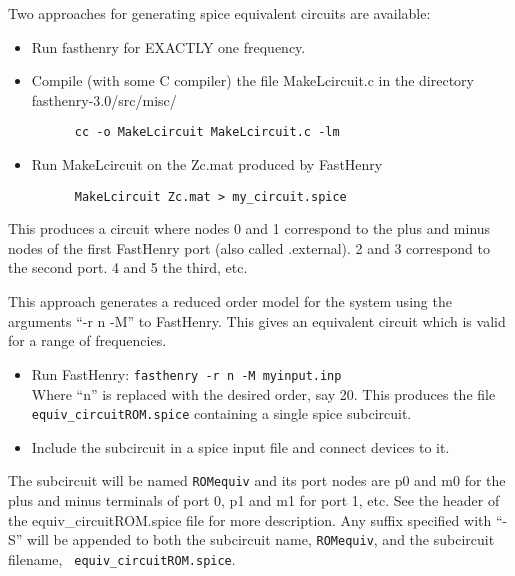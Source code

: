 Two approaches for generating spice equivalent circuits are available:

\vspace{0.1in}
  \begin{itemize}
    \item Run fasthenry for EXACTLY one frequency.
    \item Compile (with some C compiler) the file MakeLcircuit.c in
      the directory fasthenry-3.0/src/misc/ 
    \begin{verbatim}
      cc -o MakeLcircuit MakeLcircuit.c -lm
    \end{verbatim}
    \vspace{-0.1in}
    \item Run MakeLcircuit on the Zc.mat produced by FastHenry
    \begin{verbatim}
      MakeLcircuit Zc.mat > my_circuit.spice
    \end{verbatim}
  \end{itemize}

This produces a circuit where nodes 0 and 1 correspond to the plus and
minus nodes of the first
FastHenry port (also called .external).  2 and 3 correspond to the second port.
4 and 5 the third, etc.

\vspace{0.1in}

This approach generates a reduced order model for the system using the 
   arguments ``-r n -M'' to FastHenry.  This gives an equivalent
   circuit which is valid for a range of
   frequencies.
\begin{itemize}
   \item Run FastHenry: {\tt fasthenry -r n -M myinput.inp}\\
     Where ``n'' is replaced with the desired order, say 20.
     This produces the file {\tt equiv\_circuitROM.spice} containing a single
     spice subcircuit.  
   \item Include the subcircuit in a spice input file and connect
     devices to it.  
  \end{itemize}

The subcircuit will be named {\tt ROMequiv} and
its port nodes are p0 and m0 for the plus and minus terminals of
port 0, p1 and m1 for port 1, etc. See the header of the
equiv\_circuitROM.spice file for more description.  Any suffix
specified with ``-S'' will be appended to both the subcircuit
name, {\tt ROMequiv}, and the subcircuit filename, {\tt
  equiv\_circuitROM.spice}.

